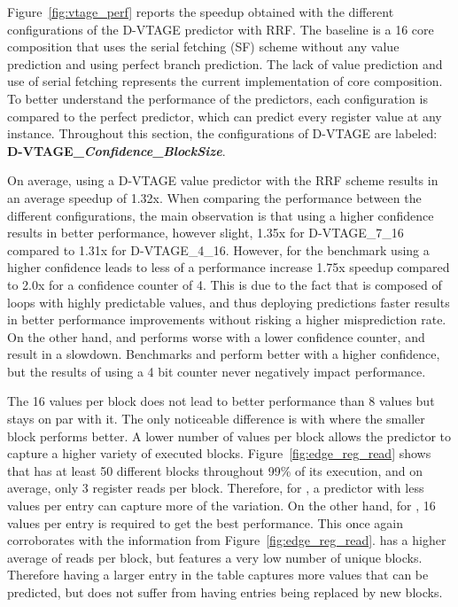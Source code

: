 Figure~\ref{fig:vtage_perf} reports the speedup obtained with the different configurations of the D-VTAGE predictor with RRF.
The baseline is a 16 core composition that uses the serial fetching (SF) scheme without any value prediction and using perfect branch prediction.
The lack of value prediction and use of serial fetching represents the current implementation of core composition.
To better understand the performance of the predictors, each configuration is compared to the perfect predictor, which can predict every register value at any instance.
Throughout this section, the configurations of D-VTAGE are labeled: \textbf{D-VTAGE\_\textit{Confidence}\_\textit{BlockSize}}.

On average, using a D-VTAGE value predictor with the RRF scheme results in an average speedup of 1.32x.
When comparing the performance between the different configurations, the main observation is that using a higher confidence results in better performance, however slight, 1.35x for D-VTAGE\_7\_16 compared to 1.31x for D-VTAGE\_4\_16.
However, for the benchmark  using a higher confidence leads to less of a performance increase 1.75x speedup compared to 2.0x for a confidence counter of 4.
This is due to the fact that  is composed of loops with highly predictable values, and thus deploying predictions faster results in better performance improvements without risking a higher misprediction rate.
On the other hand,  and  performs worse with a lower confidence counter, and result in a slowdown.
Benchmarks  and  perform better with a higher confidence, but the results of using a 4 bit counter never negatively impact performance.

The 16 values per block does not lead to better performance than 8 values but stays on par with it.
The only noticeable difference is with  where the smaller block performs better.
A lower number of values per block allows the predictor to capture a higher variety of executed blocks.
Figure~\ref{fig:edge_reg_read} shows that  has at least 50 different blocks throughout 99\% of its execution, and on average, only 3 register reads per block.
Therefore, for , a predictor with less values per entry can capture more of the variation.
On the other hand, for , 16 values per entry is required to get the best performance.
This once again corroborates with the information from Figure~\ref{fig:edge_reg_read}.
 has a higher average of reads per block, but features a very low number of unique blocks.
Therefore having a larger entry in the table captures more values that can be predicted, but does not suffer from having entries being replaced by new blocks.

